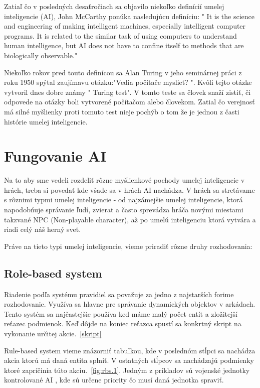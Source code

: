 \documentclass[10pt,oneside,slovak,a4paper]{article}
\begin{document}
Zatiaľ čo v posledných desaťročiach sa objavilo niekoľko definícií umelej inteligencie (AI), John McCarthy ponúka nasledujúcu definíciu:  "   It is the science and engineering of making intelligent machines, especially intelligent computer programs. It is related to the similar task of using computers to understand human intelligence, but AI does not have to confine itself to methods that are biologically observable."

Niekoľko rokov pred touto definícou sa Alan Turing v jeho seminárnej práci z roku 1950 spýtal zaujímavu otázku:"Vedia počitače myslieť? ". Kvôli tejto otázke  vytvoril dnes dobre známy " Turing test". V tomto teste sa človek snaží zistiť, či odpovede na otázky boli vytvorené počítačom alebo človekom. Zatial čo verejnosť má silné myšlienky proti tomuto test nieje pochýb o tom že je jednou z časti histórie umelej inteligencie. 

\vspace{1cm}

\section{Fungovanie AI} \label{hlavna cast}

Na to aby sme vedeli rozdeliť rôzne myšlienkové pochody umelej inteligencie v hrách, treba si povedať kde všade sa v hrách AI nachádza.
V hrách sa stretávame s rôznimi typmi umelej inteligencie - od najzámejšie umelej inteligencie, ktorá napodobńuje správanie ľudí, zvierat a často sprevádza hráča novými miestami takzvané NPC (Non-playable character), až po umelú inteligenciu ktorá vytvára a riadi celý náš herný svet. 
~\cite{1.zdroj}

Práve na tieto typi umelej inteligencie, vieme priradiť rôzne druhy rozhodovania:
\vspace{0.5cm}
\subsection{Role-based system}

Riadenie podľa systému pravidiel sa považuje za jedno z najstarších forime rozhodovanie. Využíva sa hlavne pre správanie dynamických objektov v arkádach.
Tento systém sa najčastejšie používa ked máme malý počet entít a zložitejší reťazec podmienok. Keď dôjde na koniec reťazca spustí sa konkrtný skript na vykonanie určitej akcie.~\ref{skript}

Rule-based system vieme znázorniť tabuľkou, kde v poslednóm stĺpci sa nachádza akcia ktorú má daná entita splniť. V ostatných stĺpcov sa nachádzajú podmienky ktoré zapríčinia túto akciu.~\ref{fig:rbs.1}. Jedným z príkladov sú vojenské jednotky kontrolované AI , kde sú určene priority čo musí daná jednotka spraviť.
\end{document}

